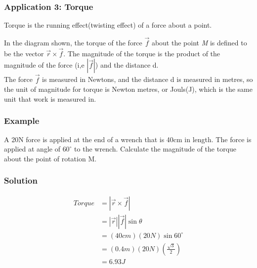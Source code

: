 \documentclass{article}
\begin{document}
 \subsubsection{Application 3: Torque}
 Torque is the running effect(twisting effect) of a force about a point.
 \begin{center}
 \end{center}

 In the diagram shown, the torque of the force $\vec{f}$ about the point \textit{M} is defined to be the vector $\vec{r} \times \vec{f}$. The magnitude of the torque is the product of the magnitude of the force (i,e $|\vec{f}|$) and the distance d.\\
 The force $\vec{f}$ is measured in Newtons, and the distance d is measured in metres, so the unit of magnitude for torque is Newton metres, or Jouls(J), which is the same unit that work is measured in.

 \subsubsection*{Example}
 A 20N force is applied at the end of a wrench that is 40cm in length. The force is applied at angle of $60^{\circ}$ to the wrench. Calculate the magnitude of the torque about the point of rotation M.

 \subsubsection*{Solution}
 \begin{align*}
     Torque &= |\vec{r}\times \vec{f}|\\
     &=|\vec{r}||\vec{f}| \sin \theta\\
     &=(40cm)(20N)\sin 60^{\circ}\\
     &=(0.4m)(20N)\left(\frac{\sqrt{3}}{2}\right)\\
     &=6.93 J
 \end{align*}
 
\end{document}
